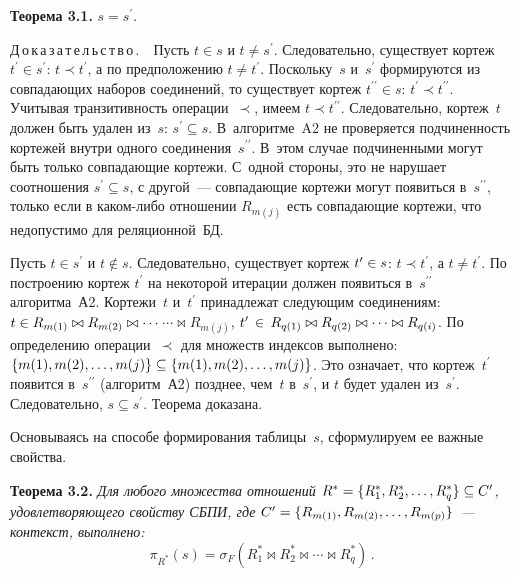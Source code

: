 \begin{multicols}{2}
  \medskip
  
  \noindent
  \textbf{Теорема 3.1.} $s=s^\prime$.
  
  \noindent
  Д\,о\,к\,а\,з\,а\,т\,е\,л\,ь\,с\,т\,в\,о\,.\ \
  {Пусть $t\in s$ и $t\not= s^\prime$. Следовательно, существует кортеж 
$t^\prime\in s^\prime$: $t\prec t^\prime$, а по предположению $t\not=t^\prime$. 
Поскольку~$s$ и~$s^\prime$ формируются из совпадающих наборов 
соединений, то существует кортеж $t^{\prime\prime}\in s$: $t^\prime\prec 
t^{\prime\prime}$. Учитывая транзитивность операции~$\prec$, имеем $t\prec 
t^{\prime\prime}$. Следовательно, кортеж~$t$ должен быть удален из~$s$: 
$s^\prime\subseteq s$. В~алгоритме~$\mathrm{A2}$ не проверяется подчиненность кортежей 
внутри одного соединения~$s^{\prime\prime}$. В~этом случае подчиненными 
могут быть только совпадающие кортежи. С~одной стороны, это не нарушает 
соотношения $s^\prime\subseteq s$, с другой~--- совпадающие кортежи могут 
появиться в~$s^{\prime\prime}$, только если в каком-либо отношении $R_{m(j)}$ 
есть совпа\-да\-ющие кортежи, что недопустимо для реляционной~БД.}
  
  \medskip
  
  Пусть $t\in s^\prime$ и $t\not\in s$. Следовательно, существует кортеж 
$t^\prime\hm\in s$: $t\prec t^\prime$, а $t\not= t^\prime$. По построению кортеж 
$t^\prime$ на некоторой итерации должен появиться в~$s^{\prime\prime}$ 
алгоритма~А2. Кортежи~$t$ и~$t^\prime$ принадлежат следующим 
соединениям: $t\hm\in  R_{m(1)}\hm\bowtie  R_{m(2)}\bowtie \cdots$\linebreak $\cdots \bowtie  
R_{m(j)}$, $t^\prime\,\in\, R_{q(1)}\hm\bowtie  R_{q(2)}\bowtie\cdots\bowtie  R_{q(i)}$.\linebreak
 По определению 
операции~$\prec$ для множеств индексов выполнено: $\{m(1), m(2), \ldots , 
m(j)\}\hm\subseteq \{m(1), m(2), \ldots , m(j)\}$. Это означает, что кортеж~$t^\prime$ 
появится в~$s^{\prime\prime}$ (алгоритм~А2) позднее, чем~$t$ в~$s^\prime$, и 
$t$ будет удален из~$s^\prime$. Следовательно, $s\subseteq s^\prime$. Теорема 
доказана.
  
  \smallskip
  
  Основываясь на способе формирования таблицы~$s$, сформулируем ее 
важные свойства.
  
  \medskip
  
  \noindent
  \textbf{Теорема 3.2.} \textit{Для любого множества отношений $R^*\hm=\{ 
R_1^*, R_2^*, \ldots , R_q^*\}\subseteq C^\prime$, удовлетворяющего свойству 
СБПИ, где $C^\prime\hm= \{R_{m(1)}, R_{m(2)}, \ldots , R_{m(p)}\}$~--- контекст, 
выполнено:}
  $$
  \pi_{R^*}(s)=\sigma_F(R_1^*\bowtie R_2^*\bowtie \cdots \bowtie R_q^*)\,.
  $$
  

\end{multicols}
